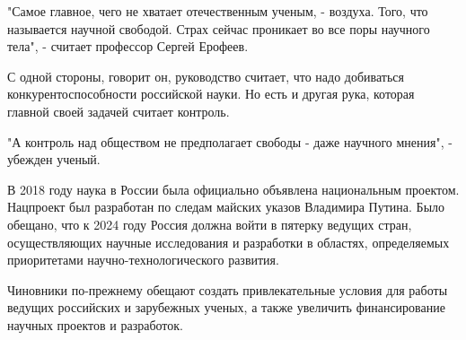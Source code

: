 "Самое главное, чего не хватает отечественным ученым, - воздуха. Того, что называется научной свободой. Страх сейчас проникает во все поры научного тела", - считает профессор Сергей Ерофеев.

С одной стороны, говорит он, руководство считает, что надо добиваться конкурентоспособности российской науки. Но есть и другая рука, которая главной своей задачей считает контроль.

"А контроль над обществом не предполагает свободы - даже научного мнения", - убежден ученый.

В 2018 году наука в России была официально объявлена национальным проектом. Нацпроект был разработан по следам майских указов Владимира Путина. Было обещано, что к 2024 году Россия должна войти в пятерку ведущих стран, осуществляющих научные исследования и разработки в областях, определяемых приоритетами научно-технологического развития.

Чиновники по-прежнему обещают создать привлекательные условия для работы ведущих российских и зарубежных ученых, а также увеличить финансирование научных проектов и разработок.